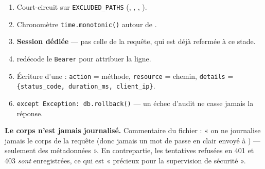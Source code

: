 \begin{enumerate}
  \item Court-circuit sur \texttt{EXCLUDED\_PATHS} (,
  , , ).
  \item Chronomètre \texttt{time.monotonic()} autour de .
  \item \textbf{Session dédiée}  --- pas celle de la requête,
  qui est déjà refermée à ce stade.
  \item {} redécode le \texttt{Bearer} pour attribuer la
  ligne.
  \item Écriture d'une  : \texttt{action} = méthode,
  \texttt{resource} = chemin, \texttt{details} =
  \texttt{\{status\_code, duration\_ms, client\_ip\}}.
  \item \texttt{except Exception: db.rollback()} --- un échec d'audit ne casse
  jamais la réponse.
\end{enumerate}

\begin{keybox}
\textbf{Le corps n'est jamais journalisé.} Commentaire du fichier : « on ne
journalise jamais le corps de la requête (donc jamais un mot de passe en clair
envoyé à ) --- seulement des métadonnées ». En contrepartie,
les tentatives refusées en 401 et 403 \emph{sont} enregistrées, ce qui est
« précieux pour la supervision de sécurité ».
\end{keybox}
